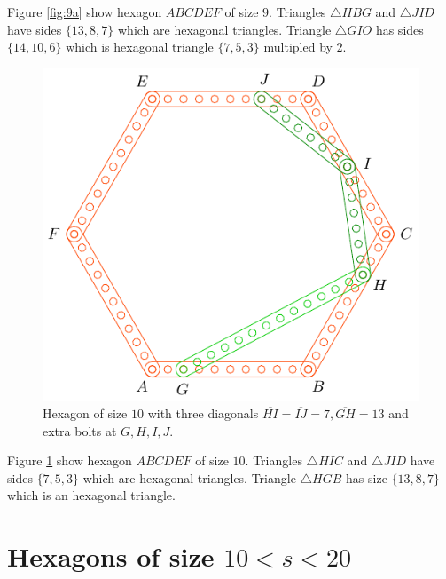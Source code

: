 \documentclass[11pt]{article}
\begin{document}
Figure \ref{fig:9a} show hexagon $ABCDEF$ of size $9$. Triangles $\triangle{HBG}$ and $\triangle{JID}$ have sides $\{13,8,7\}$ which are hexagonal triangles. Triangle $\triangle{GIO}$ has sides $\{14,10,6\}$ which is hexagonal triangle $\{7,5,3\}$ multipled by $2$.


\begin{figure}[H]
\centering
\includegraphics[scale=1]{10/hexa-10a}
\caption{Hexagon of size $10$ with three diagonals $\overline{HI} = \overline{IJ} = 7, \overline{GH} = 13$ and extra bolts at $G,H,I,J$.}
\label{fig:10a}
\end{figure}

Figure \ref{fig:10a} show hexagon $ABCDEF$ of size $10$. Triangles $\triangle{HIC}$ and $\triangle{JID}$ have sides $\{7,5,3\}$ which are hexagonal triangles. Triangle $\triangle{HGB}$ has size $\{13,8,7\}$ which is an hexagonal triangle.

\section{Hexagons of size $10 < s < 20$ }
\end{document}
